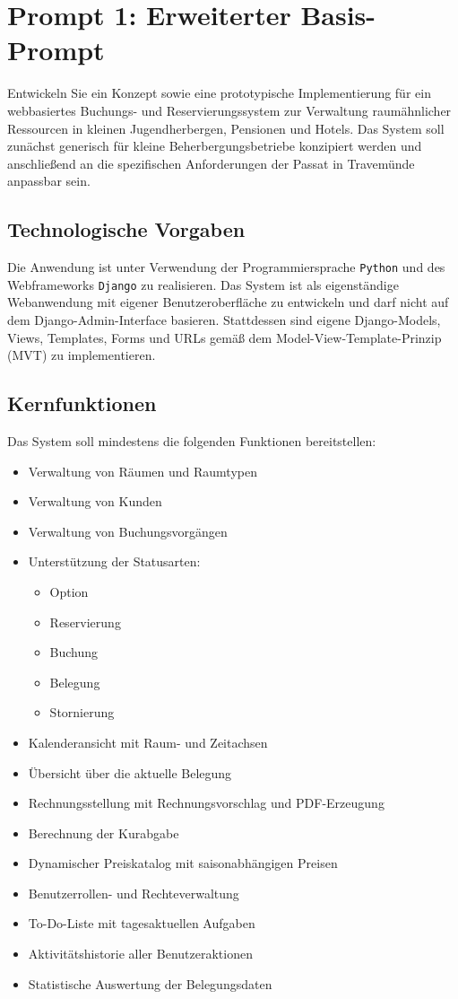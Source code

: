 \newpage
\section{Prompt 1: Erweiterter Basis-Prompt}

Entwickeln Sie ein Konzept sowie eine prototypische Implementierung für ein webbasiertes Buchungs- und Reservierungssystem zur Verwaltung raumähnlicher Ressourcen in kleinen Jugendherbergen, Pensionen und Hotels. Das System soll zunächst generisch für kleine Beherbergungsbetriebe konzipiert werden und anschließend an die spezifischen Anforderungen der Passat in Travemünde anpassbar sein.

\subsection{Technologische Vorgaben}

Die Anwendung ist unter Verwendung der Programmiersprache \texttt{Python} und des Webframeworks \texttt{Django} zu realisieren. Das System ist als eigenständige Webanwendung mit eigener Benutzeroberfläche zu entwickeln und darf nicht auf dem Django-Admin-Interface basieren. Stattdessen sind eigene Django-Models, Views, Templates, Forms und URLs gemäß dem Model-View-Template-Prinzip (MVT) zu implementieren.

\subsection{Kernfunktionen}

Das System soll mindestens die folgenden Funktionen bereitstellen:

\begin{itemize}
\item Verwaltung von Räumen und Raumtypen
\item Verwaltung von Kunden
\item Verwaltung von Buchungsvorgängen
\item Unterstützung der Statusarten:
\begin{itemize}
\item Option
\item Reservierung
\item Buchung
\item Belegung
\item Stornierung
\end{itemize}
\item Kalenderansicht mit Raum- und Zeitachsen
\item Übersicht über die aktuelle Belegung
\item Rechnungsstellung mit Rechnungsvorschlag und PDF-Erzeugung
\item Berechnung der Kurabgabe
\item Dynamischer Preiskatalog mit saisonabhängigen Preisen
\item Benutzerrollen- und Rechteverwaltung
\item To-Do-Liste mit tagesaktuellen Aufgaben
\item Aktivitätshistorie aller Benutzeraktionen
\item Statistische Auswertung der Belegungsdaten
\end{itemize}

